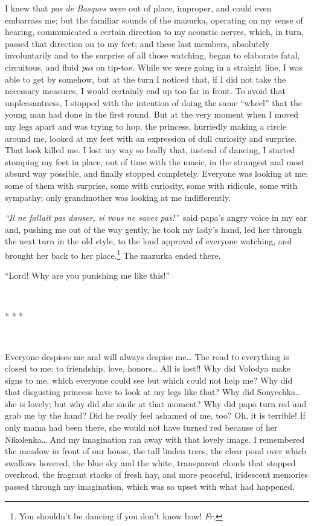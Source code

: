 I knew that \textit{pas de Basques} were out of place, improper, and could even embarrass me; but the familiar sounds of the mazurka, operating on my sense of hearing, communicated a certain direction to my acoustic nerves, which, in turn, passed that direction on to my feet; and these last members, absolutely involuntarily and to the surprise of all those watching, began to elaborate fatal, circuitous, and fluid \textit{pas} on tip-toe. While we were going in a straight line, I was able to get by somehow, but at the turn I noticed that, if I did not take the necessary measures, I would certainly end up too far in front. To avoid that unpleasantness, I stopped with the intention of doing the same ``wheel'' that the young man had done in the first round. But at the very moment when I moved my legs apart and was trying to hop, the princess, hurriedly making a circle around me, looked at my feet with an expression of dull curiosity and surprise. That look killed me. I lost my way so badly that, instead of dancing, I started stomping my feet in place, out of time with the music, in the strangest and most absurd way possible, and finally stopped completely. Everyone was looking at me: some of them with surprise, some with curiosity, some with ridicule, some with sympathy; only grandmother was looking at me indifferently.

\textit{``Il ne fallait pas danser, si vous ne savez pas!''}~said papa's angry voice in my ear and, pushing me out of the way gently, he took my lady's hand, led her through the next turn in the old style, to the loud approval of everyone watching, and brought her back to her place.\footnote{You shouldn't be dancing if you don't know how! \textit{Fr.}} The mazurka ended there. %

``Lord! Why are you punishing me like this!'' %

~

\centerline{* * *}

~

Everyone despises me and will always despise me\ldots{} The road to everything is closed to me: to friendship, love, honors\ldots{} All is lost!! Why did Volodya make signs to me, which everyone could see but which could not help me? Why did that disgusting princess have to look at my legs like that? Why did Sonyechka\ldots{}she is lovely; but why did she smile at that moment? Why did papa turn red and grab me by the hand? Did he really feel ashamed of me, too? Oh, it is terrible! If only mama had been there, she would not have turned red because of her Nikolenka\ldots{} And my imagination ran away with that lovely image. I remembered the meadow in front of our house, the tall linden trees, the clear pond over which swallows hovered, the blue sky and the white, transparent clouds that stopped overhead, the fragrant stacks of fresh hay, and more peaceful, iridescent memories passed through my imagination, which was so upset with what had happened.

